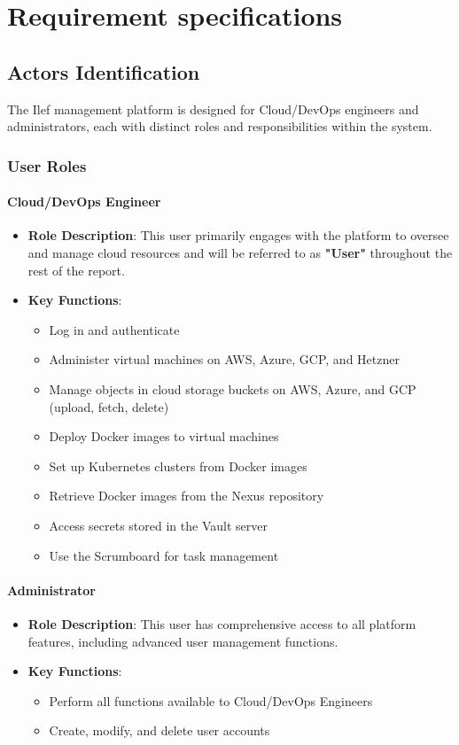 \section{Requirement specifications}
\subsection{Actors Identification}

The Ilef management platform is designed for Cloud/DevOps engineers and administrators, each with distinct roles and responsibilities within the system.

\subsubsection{User Roles}

\paragraph{Cloud/DevOps Engineer}
\begin{itemize}
    \item \textbf{Role Description}: This user primarily engages with the platform to oversee and manage cloud resources and will be referred to as \textbf{"User"} throughout the rest of the report.
    \item \textbf{Key Functions}:
    \begin{itemize}
        \item Log in and authenticate
        \item Administer virtual machines on AWS, Azure, GCP, and Hetzner
        \item Manage objects in cloud storage buckets on AWS, Azure, and GCP (upload, fetch, delete)
        \item Deploy Docker images to virtual machines
        \item Set up Kubernetes clusters from Docker images
        \item Retrieve Docker images from the Nexus repository
        \item Access secrets stored in the Vault server
        \item Use the Scrumboard for task management
    \end{itemize}
\end{itemize}

\paragraph{Administrator}
\begin{itemize}
    \item \textbf{Role Description}: This user has comprehensive access to all platform features, including advanced user management functions.
    \item \textbf{Key Functions}:
    \begin{itemize}
        \item Perform all functions available to Cloud/DevOps Engineers
        \item Create, modify, and delete user accounts
    \end{itemize}
\end{itemize}


